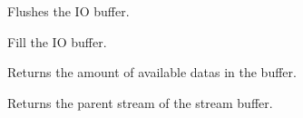 
Flushes the IO buffer.



Fill the IO buffer.



Returns the amount of available datas in the buffer.



Returns the parent stream of the stream buffer.

